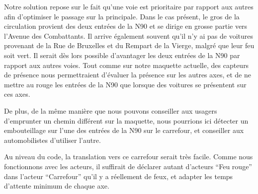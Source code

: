 Notre solution repose sur le fait qu’une voie est prioritaire par rapport aux autres afin d’optimiser le passage sur la principale. Dans le cas présent, le gros de la circulation provient des deux entrées de la N90 et se dirige en grosse partie vers l’Avenue des Combattants. Il arrive également souvent qu’il n’y ai pas de voitures provenant de la Rue de Bruxelles et du Rempart de la Vierge, malgré que leur feu soit vert. Il serait dès lors possible d’avantager les deux entrées de la N90 par rapport aux autres voies. Tout comme sur notre maquette actuelle, des capteurs de présence nous permettraient d’évaluer la présence sur les autres axes, et de ne mettre au rouge les entrées de la N90 que lorsque des voitures se présentent sur ces axes.

De plus, de la même manière que nous pouvons conseiller aux usagers d’emprunter un chemin différent sur la maquette, nous pourrions ici détecter un embouteillage sur l’une des entrées de la N90 sur le carrefour, et conseiller aux automobilistes d’utiliser l’autre.

Au niveau du code, la translation vers ce carrefour serait très facile. Comme nous fonctionnons avec les acteurs, il suffirait de déclarer autant d’acteurs “Feu rouge” dans l’acteur “Carrefour” qu’il y a réellement de feux, et adapter les temps d’attente minimum de chaque axe.
